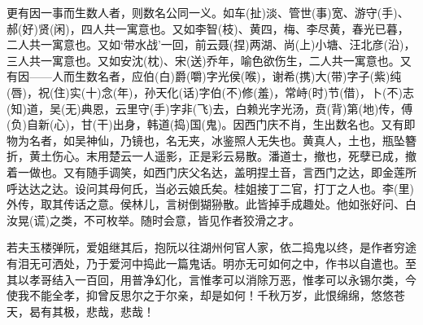 {更有因一事而生数人者，则数名公同一义。如车(扯)淡、管世(事)宽、游守(手)、郝(好)贤(闲)，四人共一寓意也。又如李智(枝)、黄四，梅、李尽黄，春光已暮，二人共一寓意也。又如‘带水战’一回，前云聂(捏)两湖、尚(上)小塘、汪北彦(沿)，三人共一寓意也。又如安沈(枕)、宋(送)乔年，喻色欲伤生，二人共一寓意也。又有因——人而生数名者，应伯(白)爵(嚼)字光侯(喉)，谢希(携)大(带)字子(紫)纯(唇)，祝(住)实(十)念(年)，孙天化(话)字伯(不)修(羞)，常峙(时)节(借)，卜(不)志(知)道，吴(无)典恩，云里守(手)字非(飞)去，白赖光字光汤，贲(背)第(地)传，傅(负)自新(心)，甘(干)出身，韩道(捣)国(鬼)。因西门庆不肖，生出数名也。又有即物为名者，如吴神仙，乃镜也，名无夹，冰鉴照人无失也。黄真人，土也，瓶坠簪折，黄土伤心。末用楚云一人遥影，正是彩云易散。潘道士，撤也，死孽已成，撤着一做也。又有随手调笑，如西门庆父名达，盖明捏土音，言西门之达，即金莲所呼达达之达。设问其母何氏，当必云娘氏矣。桂姐接丁二官，打丁之人也。李(里)外传，取其传话之意。侯林儿，言树倒猢狲散。此皆掉手成趣处。他如张好问、白汝晃(谎)之类，不可枚举。随时会意，皆见作者狡滑之才。

若夫玉楼弹阮，爱姐继其后，抱阮以往湖州何官人家，依二捣鬼以终，是作者穷途有泪无可洒处，乃于爱河中捣此一篇鬼话。明亦无可如何之中，作书以自遣也。至其以孝哥结入一百回，用普净幻化，言惟孝可以消除万恶，惟孝可以永锡尔类，今使我不能全孝，抑曾反思尔之于尔亲，却是如何！千秋万岁，此恨绵绵，悠悠苍天，曷有其极，悲哉，悲哉！


} %


